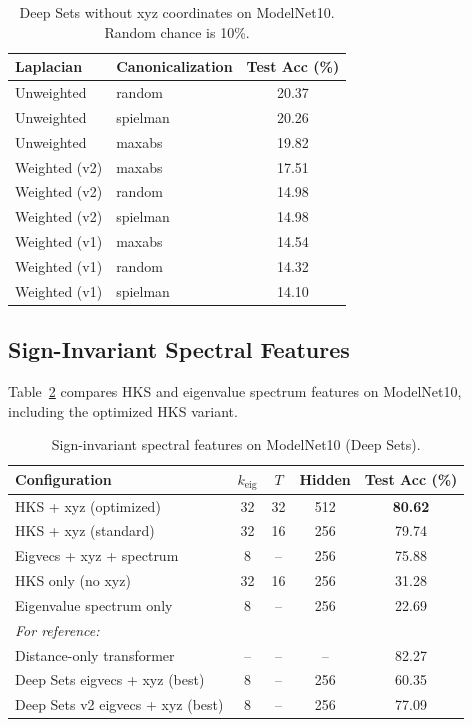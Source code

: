\documentclass[11pt]{article}
\begin{document}
\begin{table}[ht]
\centering
\caption{Deep Sets without xyz coordinates on ModelNet10. Random chance is 10\%.}
\label{tab:deepsets_noxyz}
\begin{tabular}{llc}
\toprule
\textbf{Laplacian} & \textbf{Canonicalization} & \textbf{Test Acc (\%)} \\
\midrule
Unweighted & random & 20.37 \\
Unweighted & spielman & 20.26 \\
Unweighted & maxabs & 19.82 \\
\midrule
Weighted (v2) & maxabs & 17.51 \\
Weighted (v2) & random & 14.98 \\
Weighted (v2) & spielman & 14.98 \\
\midrule
Weighted (v1) & maxabs & 14.54 \\
Weighted (v1) & random & 14.32 \\
Weighted (v1) & spielman & 14.10 \\
\bottomrule
\end{tabular}
\end{table}

\subsection{Sign-Invariant Spectral Features}

Table~\ref{tab:sign_invariant} compares HKS and eigenvalue spectrum features on ModelNet10,
including the optimized HKS variant.

\begin{table}[ht]
\centering
\caption{Sign-invariant spectral features on ModelNet10 (Deep Sets).}
\label{tab:sign_invariant}
\begin{tabular}{lcccc}
\toprule
\textbf{Configuration} & $k_{\text{eig}}$ & $T$ & \textbf{Hidden} & \textbf{Test Acc (\%)} \\
\midrule
HKS + xyz (optimized) & 32 & 32 & 512 & \textbf{80.62} \\
HKS + xyz (standard) & 32 & 16 & 256 & 79.74 \\
Eigvecs + xyz + spectrum & 8 & -- & 256 & 75.88 \\
HKS only (no xyz) & 32 & 16 & 256 & 31.28 \\
Eigenvalue spectrum only & 8 & -- & 256 & 22.69 \\
\midrule
\emph{For reference:} & & & & \\
\quad Distance-only transformer & -- & -- & -- & 82.27 \\
\quad Deep Sets eigvecs + xyz (best) & 8 & -- & 256 & 60.35 \\
\quad Deep Sets v2 eigvecs + xyz (best) & 8 & -- & 256 & 77.09 \\
\bottomrule
\end{tabular}
\end{table}
\end{document}
